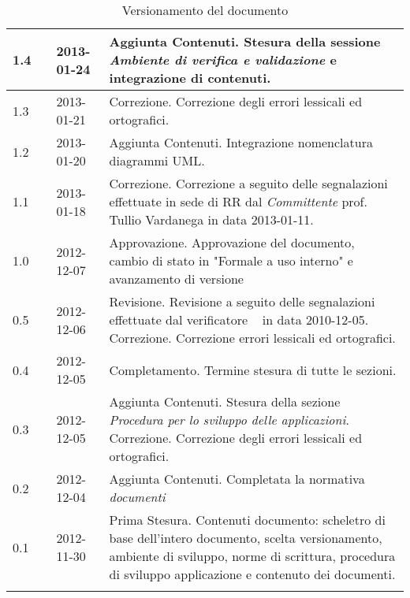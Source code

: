\begin{longtable}{p{} p{} p{} p{}}
\midrule
1.4	&	\FZ &	2013-01-24	&	Aggiunta Contenuti.\newline
						Stesura della sessione \emph{Ambiente di verifica e validazione} e integrazione di contenuti.\\
\midrule
1.3	&	\AB &	2013-01-21	&	Correzione.\newline
						Correzione degli errori lessicali ed ortografici.\\
\midrule
1.2	&	\AB &	2013-01-20	&	Aggiunta Contenuti.\newline
						Integrazione nomenclatura diagrammi UML.\\
\midrule
1.1	&	\FZ &	2013-01-18	&	Correzione.\newline
						Correzione a seguito delle segnalazioni effettuate in sede di RR dal \textit{Committente} prof. Tullio Vardanega in data 2013-01-11.\\
\midrule
1.0	&	\DC &	2012-12-07 	&	Approvazione.\newline
						Approvazione del documento, cambio di stato in "Formale a uso interno" e avanzamento di versione\\
\midrule
0.5	&	\FZ &	2012-12-06 	&	Revisione.\newline
						Revisione a seguito delle segnalazioni effettuate dal verificatore \FZ~ in data 2010-12-05.\newline
						Correzione.\newline
						Correzione errori lessicali ed ortografici.\\
\midrule
0.4	&	\VP &	2012-12-05 	&	Completamento.\newline
						Termine stesura di tutte le sezioni.\\
\midrule
0.3	&	\VP &	2012-12-05 	&	Aggiunta Contenuti.\newline 
						Stesura della sezione \emph{Procedura per lo sviluppo delle applicazioni}.\newline 
						Correzione.\newline
						Correzione degli errori lessicali ed ortografici.\\
\midrule
0.2	&	\EZ &	2012-12-04 	&	Aggiunta Contenuti.\newline
						Completata la normativa \emph{documenti}\\
\midrule
0.1	&	\VP &	2012-11-30 	&	Prima Stesura.\newline 
						Contenuti documento: scheletro di base dell'intero documento, scelta versionamento, ambiente di sviluppo, norme di scrittura, 
						procedura di sviluppo applicazione e contenuto dei documenti.\\
\bottomrule

\caption{Versionamento del documento}
\end{longtable}

